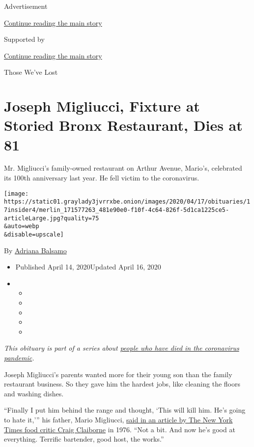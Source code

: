 Advertisement

\protect\hyperlink{after-top}{Continue reading the main story}

Supported by

\protect\hyperlink{after-sponsor}{Continue reading the main story}

Those We've Lost

\hypertarget{joseph-migliucci-fixture-at-storied-bronx-restaurant-dies-at-81}{%
\section{Joseph Migliucci, Fixture at Storied Bronx Restaurant, Dies at
81}\label{joseph-migliucci-fixture-at-storied-bronx-restaurant-dies-at-81}}

Mr. Migliucci's family-owned restaurant on Arthur Avenue, Mario's,
celebrated its 100th anniversary last year. He fell victim to the
coronavirus.

\texttt{[image: https://static01.graylady3jvrrxbe.onion/images/2020/04/17/obituaries/17insider4/merlin\_171577263\_481e90e0-f10f-4c64-826f-5d1ca1225ce5-articleLarge.jpg?quality=75\\\&auto=webp\\\&disable=upscale]}

By \href{https://www.nytimes3xbfgragh.onion/by/adriana-balsamo}{Adriana
Balsamo}

\begin{itemize}
\item
  Published April 14, 2020Updated April 16, 2020
\item
  \begin{itemize}
  \item
  \item
  \item
  \item
  \item
  \end{itemize}
\end{itemize}

\emph{This obituary is part of a series about}
\href{https://www.nytimes3xbfgragh.onion/series/people-who-have-died-of-the-coronavirus}{\emph{people
who have died in the coronavirus pandemic}}\emph{.}

Joseph Migliucci's parents wanted more for their young son than the
family restaurant business. So they gave him the hardest jobs, like
cleaning the floors and washing dishes.

``Finally I put him behind the range and thought, `This will kill him.
He's going to hate it,''' his father, Mario Migliucci,
\href{https://www.nytimes3xbfgragh.onion/1976/09/15/archives/from-a-family-of-chefs-a-feast-of-robust-neapolitan-food.html}{said
in an article by The New York Times food critic Craig Claiborne} in
1976. ``Not a bit. And now he's good at everything. Terrific bartender,
good host, the works.''

